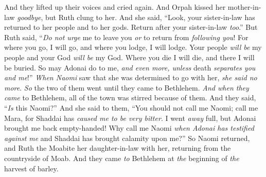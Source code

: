 \begin{biblechapter}
\verse And they lifted up their voices and cried again. And Orpah kissed her mother-in-law \textit{goodbye}, but Ruth clung to her.
\verse And she said, “Look, your sister-in-law has returned to her people and to her gods. Return after your sister-in-law \textit{too}.”
\verse But Ruth said, “\textit{Do not urge} me to leave you \textit{or} to return from \textit{following you}! For where you go, I will go, and where you lodge, I will lodge. Your people \textit{will be} my people and your God \textit{will be} my God.
\verse Where you die I will die, and there I will be buried. So may Adonai do to me, \textit{and even more, unless} death \textit{separates you and me}!”
\verse \textit{When Naomi} saw that she was determined to go with her, \textit{she said no more}.
\verse \textit{So} the two of them went until they came to Bethlehem. \textit{And when they came} to Bethlehem, all of the town was stirred because of them. And they said, “\textit{Is} this Naomi?”
\verse And she said to them, “You should not call me Naomi; call me Mara, for Shaddai has \textit{caused me to be very bitter}.
\verse I went \textit{away} full, but Adonai brought me back empty-handed! Why call me Naomi \textit{when Adonai has testified against me} and Shaddai has brought calamity upon me?”
\verse So Naomi returned, and Ruth the Moabite her daughter-in-law with her, returning from the countryside of Moab. And they came \textit{to} Bethlehem at \textit{the} beginning of \textit{the} harvest of barley.
\end{biblechapter}


